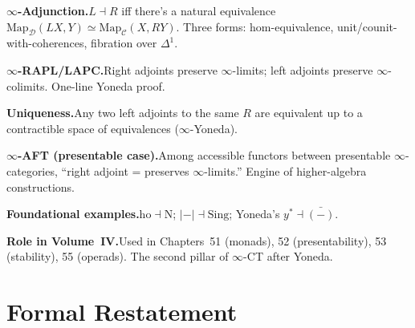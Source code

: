 \begin{summarybox}
\textbf{$\infty$-Adjunction.}\quad $L \dashv R$ iff there's a natural
equivalence $\mathrm{Map}_\mathcal{D}(LX, Y) \simeq \mathrm{Map}_\mathcal{C}(X, RY)$.
Three forms: hom-equivalence, unit/counit-with-coherences, fibration over
$\Delta^1$.

\textbf{$\infty$-RAPL/LAPC.}\quad Right adjoints preserve $\infty$-limits;
left adjoints preserve $\infty$-colimits. One-line Yoneda proof.

\textbf{Uniqueness.}\quad Any two left adjoints to the same $R$ are
equivalent up to a contractible space of equivalences ($\infty$-Yoneda).

\textbf{$\infty$-AFT (presentable case).}\quad Among accessible functors
between presentable $\infty$-categories, ``right adjoint = preserves
$\infty$-limits.'' Engine of higher-algebra constructions.

\textbf{Foundational examples.}\quad $\mathrm{ho} \dashv \mathrm{N}$;
$\lvert{-}\rvert \dashv \mathrm{Sing}$; Yoneda's $y^* \dashv \bar{(-)}$.

\textbf{Role in Volume~IV.}\quad Used in Chapters~51 (monads), 52
(presentability), 53 (stability), 55 (operads). The second pillar of
$\infty$-CT after Yoneda.
\end{summarybox}


\section*{Formal Restatement}

